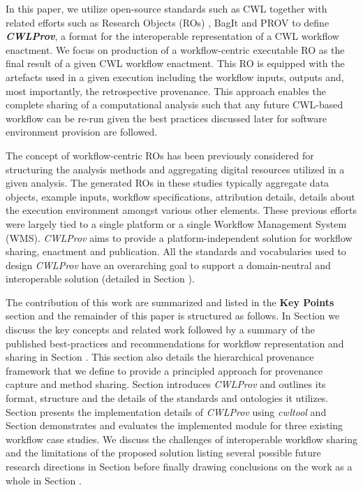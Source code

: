\documentclass[a4paper,num-refs]{oup-contemporary}
\begin{document}
In this paper, we utilize open-source standards such as CWL together with related efforts such as Research Objects (ROs) \citep{belhajjame_2015}, BagIt \citep{bagit17} and PROV \citep{Missier2013} to define \textbf{\textit{CWLProv}}, a format for the interoperable representation of a CWL workflow enactment. We focus on production of a workflow-centric executable RO as the final result of a given CWL workflow enactment. This RO is equipped with the artefacts used in a given execution including the workflow inputs, outputs and, most importantly, the retrospective provenance. This approach enables the complete sharing of a computational analysis such that any future CWL-based workflow can be re-run given the best practices discussed later for software environment provision are followed.

The concept of workflow-centric ROs has been previously considered \citep{belhajjame_2015, hettne_2014, belhajjame_2012} for structuring the analysis methods and aggregating digital resources utilized in a given analysis. The generated ROs in these studies typically aggregate data objects, example inputs, workflow specifications, attribution details, details about the execution environment amongst various other elements. These previous efforts were largely tied to a single platform or a single Workflow Management System (WMS). \textit{CWLProv} aims to provide a platform-independent solution for workflow sharing, enactment and publication. All the standards and vocabularies used to design \textit{CWLProv} have an overarching goal to support a domain-neutral and interoperable solution (detailed in Section \textbf{}). 

The contribution of this work are summarized and listed in the \textbf{Key Points} section and the remainder of this paper is structured as follows. In Section \textbf{} we discuss the key concepts and related work followed by a summary of the published best-practices and recommendations for workflow representation and sharing in Section \textbf{}. This section also details the hierarchical provenance framework that we define to provide a principled approach for provenance capture and method sharing. Section \textbf{} introduces \textit{CWLProv} and outlines its format, structure and the details of the standards and ontologies it utilizes. Section \textbf{} presents the implementation details of \textit{CWLProv} using \textit{cwltool} \citep{cwltool} and Section \textbf{} demonstrates and evaluates the implemented module for three existing workflow case studies. We discuss the challenges of interoperable workflow sharing and the limitations of the proposed solution listing several possible future research directions in Section \textbf{} before finally drawing conclusions on the work as a whole in Section \textbf{}.
\end{document}
